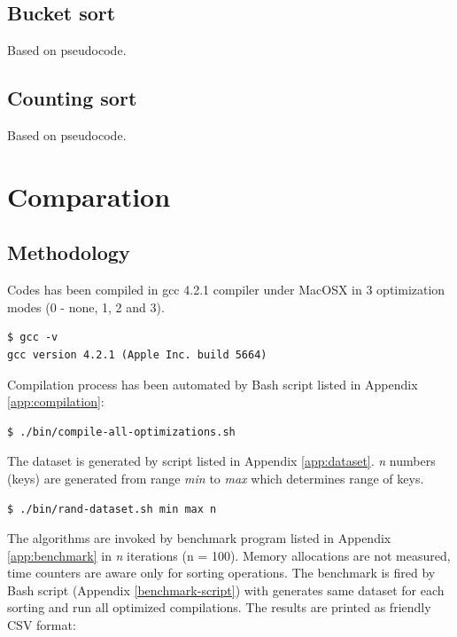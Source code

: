 \documentclass[12pt]{article}
\begin{document}
\subsection{Bucket sort}

Based on pseudocode\cite{czech}.



\subsection{Counting sort}

Based on pseudocode\cite{czech}.



\section{Comparation}

\subsection{Methodology}

Codes has been compiled in gcc 4.2.1 compiler under MacOSX in 3 optimization modes (0 - none, 1, 2 and 3)\cite{man-gcc}.

\begin{lstlisting}
$ gcc -v
gcc version 4.2.1 (Apple Inc. build 5664)
\end{lstlisting}

Compilation process has been automated by Bash script listed in Appendix \ref{app:compilation}:

\begin{lstlisting}
$ ./bin/compile-all-optimizations.sh
\end{lstlisting}

The dataset is generated by script listed in Appendix \ref{app:dataset}. \emph{n} numbers (keys) are generated from range \emph{min} to \emph{max} which determines range of keys.

\begin{lstlisting}
$ ./bin/rand-dataset.sh min max n
\end{lstlisting}

The algorithms are invoked by benchmark program listed in Appendix \ref{app:benchmark} in \emph{n} iterations (n = 100). Memory allocations are not measured, time counters are aware only for sorting operations. The benchmark is fired by Bash script (Appendix \ref{benchmark-script}) with generates same dataset for each sorting and run all optimized compilations. The results are printed as friendly CSV format:
\end{document}
